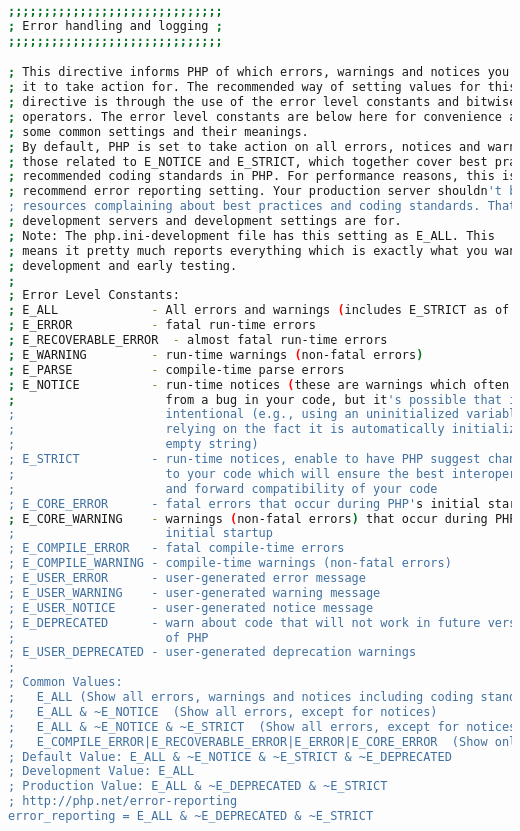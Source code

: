 \begin{lstlisting}[language=bash]
;;;;;;;;;;;;;;;;;;;;;;;;;;;;;;
; Error handling and logging ;
;;;;;;;;;;;;;;;;;;;;;;;;;;;;;;

; This directive informs PHP of which errors, warnings and notices you would like
; it to take action for. The recommended way of setting values for this
; directive is through the use of the error level constants and bitwise
; operators. The error level constants are below here for convenience as well as
; some common settings and their meanings.
; By default, PHP is set to take action on all errors, notices and warnings EXCEPT
; those related to E_NOTICE and E_STRICT, which together cover best practices and
; recommended coding standards in PHP. For performance reasons, this is the
; recommend error reporting setting. Your production server shouldn't be wasting
; resources complaining about best practices and coding standards. That's what
; development servers and development settings are for.
; Note: The php.ini-development file has this setting as E_ALL. This
; means it pretty much reports everything which is exactly what you want during
; development and early testing.
;
; Error Level Constants:
; E_ALL             - All errors and warnings (includes E_STRICT as of PHP 5.4.0)
; E_ERROR           - fatal run-time errors
; E_RECOVERABLE_ERROR  - almost fatal run-time errors
; E_WARNING         - run-time warnings (non-fatal errors)
; E_PARSE           - compile-time parse errors
; E_NOTICE          - run-time notices (these are warnings which often result
;                     from a bug in your code, but it's possible that it was
;                     intentional (e.g., using an uninitialized variable and
;                     relying on the fact it is automatically initialized to an
;                     empty string)
; E_STRICT          - run-time notices, enable to have PHP suggest changes
;                     to your code which will ensure the best interoperability
;                     and forward compatibility of your code
; E_CORE_ERROR      - fatal errors that occur during PHP's initial startup
; E_CORE_WARNING    - warnings (non-fatal errors) that occur during PHP's
;                     initial startup
; E_COMPILE_ERROR   - fatal compile-time errors
; E_COMPILE_WARNING - compile-time warnings (non-fatal errors)
; E_USER_ERROR      - user-generated error message
; E_USER_WARNING    - user-generated warning message
; E_USER_NOTICE     - user-generated notice message
; E_DEPRECATED      - warn about code that will not work in future versions
;                     of PHP
; E_USER_DEPRECATED - user-generated deprecation warnings
;
; Common Values:
;   E_ALL (Show all errors, warnings and notices including coding standards.)
;   E_ALL & ~E_NOTICE  (Show all errors, except for notices)
;   E_ALL & ~E_NOTICE & ~E_STRICT  (Show all errors, except for notices and coding standards warnings.)
;   E_COMPILE_ERROR|E_RECOVERABLE_ERROR|E_ERROR|E_CORE_ERROR  (Show only errors)
; Default Value: E_ALL & ~E_NOTICE & ~E_STRICT & ~E_DEPRECATED
; Development Value: E_ALL
; Production Value: E_ALL & ~E_DEPRECATED & ~E_STRICT
; http://php.net/error-reporting
error_reporting = E_ALL & ~E_DEPRECATED & ~E_STRICT


\end{lstlisting}
